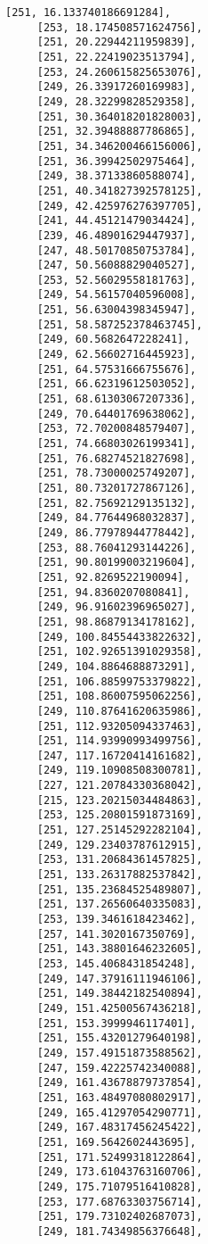 \documentclass[11pt]{article}
\begin{document}
\begin{tcolorbox}[breakable, size=fbox, boxrule=.5pt, pad at break*=1mm, opacityfill=0]
\begin{Verbatim}[commandchars=\\\{\}]
     [251, 16.133740186691284],
     [253, 18.174508571624756],
     [251, 20.22944211959839],
     [251, 22.22419023513794],
     [253, 24.260615825653076],
     [249, 26.33917260169983],
     [249, 28.32299828529358],
     [251, 30.364018201828003],
     [251, 32.39488887786865],
     [251, 34.346200466156006],
     [251, 36.39942502975464],
     [249, 38.37133860588074],
     [251, 40.341827392578125],
     [249, 42.425976276397705],
     [241, 44.45121479034424],
     [239, 46.48901629447937],
     [247, 48.50170850753784],
     [247, 50.56088829040527],
     [253, 52.56029558181763],
     [249, 54.56157040596008],
     [251, 56.63004398345947],
     [251, 58.587252378463745],
     [249, 60.5682647228241],
     [249, 62.56602716445923],
     [251, 64.57531666755676],
     [251, 66.62319612503052],
     [251, 68.61303067207336],
     [249, 70.64401769638062],
     [253, 72.70200848579407],
     [251, 74.66803026199341],
     [251, 76.68274521827698],
     [251, 78.73000025749207],
     [251, 80.73201727867126],
     [251, 82.75692129135132],
     [249, 84.77644968032837],
     [249, 86.77978944778442],
     [253, 88.76041293144226],
     [251, 90.80199003219604],
     [251, 92.8269522190094],
     [251, 94.8360207080841],
     [249, 96.91602396965027],
     [251, 98.86879134178162],
     [249, 100.84554433822632],
     [251, 102.92651391029358],
     [249, 104.8864688873291],
     [251, 106.88599753379822],
     [251, 108.86007595062256],
     [249, 110.87641620635986],
     [251, 112.93205094337463],
     [251, 114.93990993499756],
     [247, 117.16720414161682],
     [249, 119.10908508300781],
     [227, 121.20784330368042],
     [215, 123.20215034484863],
     [253, 125.20801591873169],
     [251, 127.25145292282104],
     [249, 129.23403787612915],
     [253, 131.20684361457825],
     [251, 133.26317882537842],
     [251, 135.23684525489807],
     [251, 137.26560640335083],
     [253, 139.3461618423462],
     [257, 141.3020167350769],
     [251, 143.38801646232605],
     [253, 145.4068431854248],
     [249, 147.37916111946106],
     [251, 149.38442182540894],
     [249, 151.42500567436218],
     [251, 153.3999946117401],
     [251, 155.43201279640198],
     [249, 157.49151873588562],
     [247, 159.42225742340088],
     [249, 161.43678879737854],
     [251, 163.48497080802917],
     [249, 165.41297054290771],
     [249, 167.48317456245422],
     [251, 169.5642602443695],
     [251, 171.52499318122864],
     [249, 173.61043763160706],
     [249, 175.71079516410828],
     [253, 177.68763303756714],
     [251, 179.73102402687073],
     [249, 181.74349856376648],

\end{Verbatim}
\end{tcolorbox}
\end{document}
